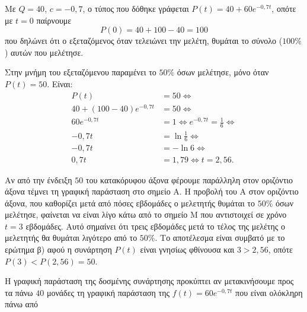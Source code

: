 \begin{alist}
\item Με $Q=40$, $c=-0{,}7$, ο τύπος που δόθηκε γράφεται $P(t) = 40 + 60e^{-0{,}7t}$, οπότε με $t=0$ παίρνουμε
\[P(0) = 40 + 100 - 40 = 100\]
που δηλώνει ότι ο εξεταζόμενος όταν τελειώνει την μελέτη, θυμάται το σύνολο ($100\%$) αυτών που μελέτησε.
\item Στην μνήμη του εξεταζόμενου παραμένει το $50\%$ όσων μελέτησε, μόνο όταν $P(t) = 50$. Είναι:
\begin{align*}
P(t) &= 50 \Leftrightarrow \\
40 + (100 - 40)e^{-0{,}7t} &= 50 \Leftrightarrow \\
60e^{-0{,}7t} &= 1 \Leftrightarrow e^{-0{,}7t} = \frac{1}{6} \Leftrightarrow \\
-0{,}7t &= \ln\frac{1}{6} \Leftrightarrow \\
-0{,}7t &= -\ln 6 \Leftrightarrow \\
0{,}7t &= 1{,}79 \Leftrightarrow t = 2{,}56.
\end{align*}
\item Αν από την ένδειξη $50$ του κατακόρυφου άξονα φέρουμε παράλληλη στον οριζόντιο άξονα τέμνει τη γραφική παράσταση στο σημείο $\text{A}$. Η προβολή του $\text{A}$ στον οριζόντιο άξονα, που καθορίζει μετά από πόσες εβδομάδες ο μελετητής θυμάται το $50\%$ όσων μελέτησε, φαίνεται να είναι λίγο κάτω από το σημείο $\text{M}$ που αντιστοιχεί σε χρόνο $t=3$ εβδομάδες. Αυτό σημαίνει ότι τρεις εβδομάδες μετά το τέλος της μελέτης ο μελετητής θα θυμάται λιγότερο από το $50\%$. Το αποτέλεσμα είναι συμβατό με το ερώτημα β) αφού η συνάρτηση $P(t)$ είναι γνησίως φθίνουσα και $3 > 2{,}56$, οπότε $P(3) < P(2{,}56) = 50$.
\begin{center}
\end{center}
\item Η γραφική παράσταση της δοσμένης συνάρτησης προκύπτει αν μετακινήσουμε προς τα πάνω $40$ μονάδες τη γραφική παράσταση της $f(t) = 60e^{-0{,}7t}$ που είναι ολόκληρη πάνω από
\end{alist}

